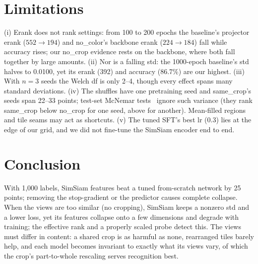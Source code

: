 \documentclass[10pt,twocolumn,letterpaper]{article}
\begin{document}
\section{Limitations}
\label{sec:limitations}

(i) Erank does not rank settings: from 100 to 200 epochs the baseline's projector erank ($552\to194$) and no\_color's backbone erank ($224\to184$) fall while accuracy rises; our no\_crop evidence rests on the backbone, where both fall together by large amounts.
(ii) Nor is a falling std: the 1000-epoch baseline's std halves to 0.0100, yet its erank (392) and accuracy (86.7\%) are our highest.
(iii) With $n{=}3$ seeds the Welch df is only 2--4, though every effect spans many standard deviations.
(iv) The shuffles have one pretraining seed and same\_crop's seeds span 22--33 points; test-set McNemar tests~\cite{mcnemar1947} ignore such variance (they rank same\_crop below no\_crop for one seed, above for another). Mean-filled regions and tile seams may act as shortcuts.
(v) The tuned SFT's best lr (0.3) lies at the edge of our grid, and we did not fine-tune the SimSiam encoder end to end.

\section{Conclusion}
\label{sec:conclusion}
With 1,000 labels, SimSiam features beat a tuned from-scratch network by 25 points; removing the stop-gradient or the predictor causes complete collapse.
When the views are too similar (no cropping), SimSiam keeps a nonzero std and a lower loss, yet its features collapse onto a few dimensions and degrade with training; the effective rank and a properly scaled probe detect this.
The views must differ in content: a shared crop is as harmful as none, rearranged tiles barely help, and each model becomes invariant to exactly what its views vary, of which the crop's part-to-whole rescaling serves recognition best.

{
    \small
    
    
}
\end{document}
